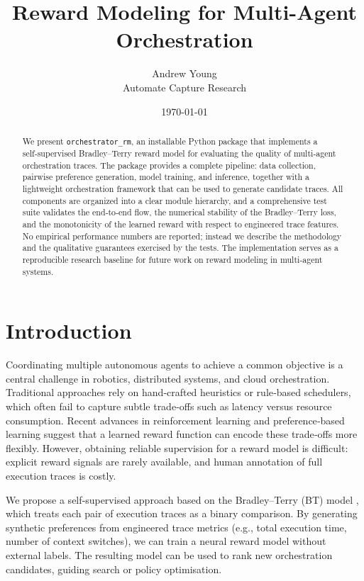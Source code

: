 \documentclass[11pt,a4paper]{article}
\title{Reward Modeling for Multi-Agent Orchestration}
\author{Andrew Young \\ Automate Capture Research}
\date{\today}
\begin{document}
\maketitle

\begin{abstract}
We present \texttt{orchestrator\_rm}, an installable Python package that implements a self‑supervised Bradley–Terry reward model for evaluating the quality of multi‑agent orchestration traces.  The package provides a complete pipeline: data collection, pairwise preference generation, model training, and inference, together with a lightweight orchestration framework that can be used to generate candidate traces.  All components are organized into a clear module hierarchy, and a comprehensive test suite validates the end‑to‑end flow, the numerical stability of the Bradley–Terry loss, and the monotonicity of the learned reward with respect to engineered trace features.  No empirical performance numbers are reported; instead we describe the methodology and the qualitative guarantees exercised by the tests.  The implementation serves as a reproducible research baseline for future work on reward modeling in multi‑agent systems.
\end{abstract}

\section{Introduction}
Coordinating multiple autonomous agents to achieve a common objective is a central challenge in robotics, distributed systems, and cloud orchestration.  Traditional approaches rely on hand‑crafted heuristics or rule‑based schedulers, which often fail to capture subtle trade‑offs such as latency versus resource consumption.  Recent advances in reinforcement learning and preference‑based learning suggest that a learned reward function can encode these trade‑offs more flexibly.  However, obtaining reliable supervision for a reward model is difficult: explicit reward signals are rarely available, and human annotation of full execution traces is costly.

We propose a self‑supervised approach based on the Bradley–Terry (BT) model \cite{bradley1952rank}, which treats each pair of execution traces as a binary comparison.  By generating synthetic preferences from engineered trace metrics (e.g., total execution time, number of context switches), we can train a neural reward model without external labels.  The resulting model can be used to rank new orchestration candidates, guiding search or policy optimisation.
\end{document}
